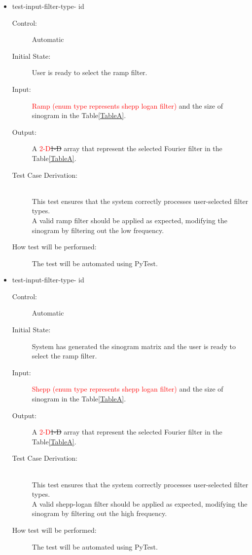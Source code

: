 \documentclass[12pt, titlepage]{article}
\newcounter{testnum}
\newcommand{\dthetestnum}{id\thetestnum}
\newcommand{\add}{\textcolor{red}}
\begin{document}
\begin{itemize}
\item{test-input-filter-type- \label{id2} \dthetestnum}
\begin{description}
\item[Control:] Automatic

\item[Initial State:] User is ready to select the ramp filter.

\item[Input:] \add{Ramp (enum type represents shepp logan filter)} and the size of sinogram in the Table\ref{TableA}.

\item[Output:] A \add{2-D}\st{1-D} array that represent the selected Fourier filter in the Table\ref{TableA}.

\item[Test Case Derivation:] \hfill \\
  This test ensures that the system correctly processes
  user-selected filter types.\\
  A valid ramp filter should be applied as expected, modifying the sinogram
  by filtering out the low frequency.

\item[How test will be performed:] The test will be automated using PyTest.
\end{description}
\end{itemize}

\begin{itemize}
\item{test-input-filter-type- \label{id3} \dthetestnum}
\begin{description}
\item[Control:] Automatic


\item[Initial State:] System has generated the sinogram matrix and the user is
  ready to select the ramp filter.

\item[Input:] \add{Shepp (enum type represents shepp logan filter)} and the size of sinogram in the Table\ref{TableA}.

\item[Output:] A \add{2-D}\st{1-D} array that represent the selected Fourier filter in the Table\ref{TableA}.

\item[Test Case Derivation:] \hfill \\
  This test ensures that the system correctly processes
  user-selected filter types.\\
  A valid shepp-logan filter should be applied as expected, modifying the
  sinogram by filtering out the high frequency.

\item[How test will be performed:] The test will be automated using PyTest.
\end{description}
\end{itemize}
\end{document}

